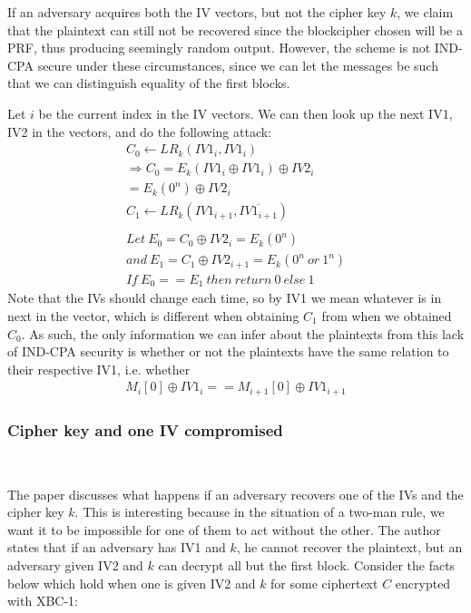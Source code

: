 \documentclass[conference]{IEEEtran}
\begin{document}
If an adversary acquires both the IV vectors, but not the cipher key $k$, we claim that the plaintext can still not be recovered since the blockcipher chosen will be a PRF, thus producing seemingly random output. However, the scheme is not IND-CPA secure under these circumstances, since we can let the messages be such that we can distinguish equality of the first blocks.

Let $i$ be the current index in the IV vectors. We can then look up the next IV1, IV2 in the vectors, and do the following attack:
\begin{gather*}
  C_0 \leftarrow LR_k(IV1_i, IV1_i) \\
  \Rightarrow C_0=E_k(IV1_i \oplus IV1_i) \oplus IV2_i \\
  = E_k(0^n) \oplus IV2_i \\
  C_1 \leftarrow LR_k(IV1_{i+1}, \overline{IV1_{i+1}}) \\ \\
  Let\ E_0=C_0 \oplus IV2_i=E_k(0^n) \\
  and\ E_1=C_1 \oplus IV2_{i+1}=E_k(0^n\ or\ 1^n) \\
  If\ E_0==E_1\ then\ return\ 0\ else\ 1
\end{gather*}
Note that the IVs should change each time, so by IV1 we mean whatever is in next in the vector, which is different when obtaining $C_1$ from when we obtained $C_0$. As such, the only information we can infer about the plaintexts from this lack of IND-CPA security is whether or not the plaintexts have the same relation to their respective IV1, i.e. whether
\begin{gather*}
  M_i[0] \oplus IV1_i == M_{i+1}[0] \oplus IV1_{i+1}
\end{gather*}

\subsubsection{Cipher key and one IV compromised} \

The paper discusses what happens if an adversary recovers one of the IVs and the cipher key $k$. This is interesting because in the situation of a two-man rule, we want it to be impossible for one of them to act without the other. The author states that if an adversary has IV1 and $k$, he cannot recover the plaintext, but an adversary given IV2 and $k$ can decrypt all but the first block. Consider the facts below which hold when one is given IV2 and $k$ for some ciphertext $C$ encrypted with XBC-1:
\end{document}
